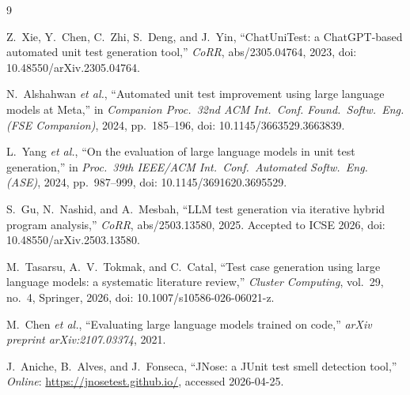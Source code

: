 \documentclass[journal]{IEEEtran}
\begin{document}
\begin{thebibliography}{9}

Z.~Xie, Y.~Chen, C.~Zhi, S.~Deng, and J.~Yin, ``ChatUniTest: a
ChatGPT-based automated unit test generation tool,'' \emph{CoRR},
abs/2305.04764, 2023, doi: 10.48550/arXiv.2305.04764.

N.~Alshahwan \emph{et al.}, ``Automated unit test improvement using large
language models at Meta,'' in \emph{Companion Proc.\ 32nd ACM Int.\ Conf.
Found.\ Softw.\ Eng. (FSE Companion)}, 2024, pp.~185--196, doi:
10.1145/3663529.3663839.

L.~Yang \emph{et al.}, ``On the evaluation of large language models in
unit test generation,'' in \emph{Proc.\ 39th IEEE/ACM Int.\ Conf.\
Automated Softw.\ Eng. (ASE)}, 2024, pp.~987--999, doi:
10.1145/3691620.3695529.

S.~Gu, N.~Nashid, and A.~Mesbah, ``LLM test generation via iterative
hybrid program analysis,'' \emph{CoRR}, abs/2503.13580, 2025. Accepted to
ICSE 2026, doi: 10.48550/arXiv.2503.13580.

M.~Tasarsu, A.~V.\ Tokmak, and C.~Catal, ``Test case generation using
large language models: a systematic literature review,'' \emph{Cluster
Computing}, vol.~29, no.~4, Springer, 2026, doi:
10.1007/s10586-026-06021-z.

M.~Chen \emph{et al.}, ``Evaluating large language models trained on
code,'' \emph{arXiv preprint arXiv:2107.03374}, 2021.

J.~Aniche, B.~Alves, and J.~Fonseca, ``JNose: a JUnit test smell detection
tool,'' \emph{Online}: \url{https://jnosetest.github.io/}, accessed
2026-04-25.

\end{thebibliography}
\end{document}
